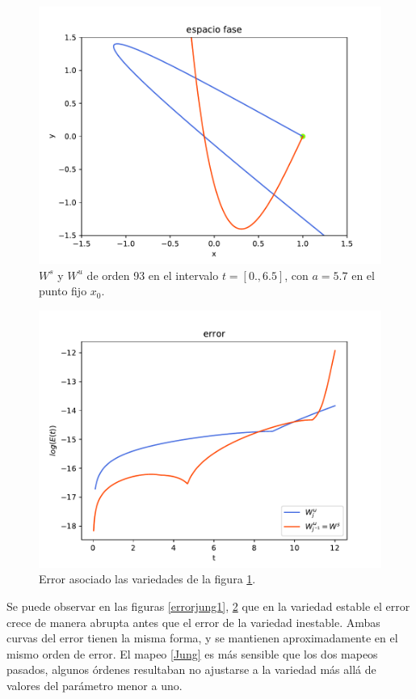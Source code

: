 \begin{figure}[H]
\centering
\includegraphics[scale=0.7]{jung57}
\caption{$W^{s}$ y $W^{u}$ de orden 93 en el intervalo $t=[0.,6.5]$, con $a=5.7$ en el punto fijo $x_{0}$.}
\label{jung2}
\end{figure}


\begin{figure}[H]
\centering
\includegraphics[scale=0.7]{error_jung57}
\caption{Error asociado las variedades de la figura \ref{jung2}.}
\label{errorjung2}
\end{figure}
Se puede observar en las figuras \ref{errorjung1}, \ref{errorjung2} que en la variedad estable el error crece de manera abrupta antes que el error de la variedad inestable. Ambas curvas del error tienen la misma forma, y se mantienen aproximadamente en el mismo orden de error. El mapeo \eqref{Jung} es más sensible que los dos mapeos pasados, algunos órdenes resultaban no ajustarse a la variedad más allá de valores del parámetro menor a uno. 


